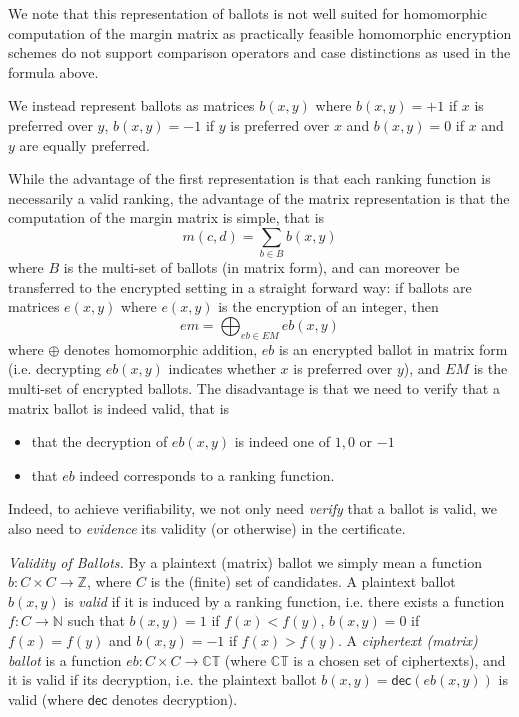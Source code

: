 \documentclass{llncs}
\newcommand{\Nat}{\mathbb{N}}
\newcommand{\Z}{\mathbb{Z}}
\newcommand{\encb}{\mathit{eb}}
\newcommand{\EncB}{\mathit{EM}}
\newcommand{\encm}{\mathit{em}}
\newcommand{\CT}{\mathbb{CT}}
\newcommand{\dec}{\mathsf{dec}}
\begin{document}
We note that this representation of ballots is not well suited for
homomorphic computation of the margin matrix as practically feasible
homomorphic encryption schemes do not support comparison operators
and case distinctions as used in the formula above. 

We instead represent ballots as matrices
$b(x, y)$ where $b(x, y) = +1$ if $x$ is preferred
over $y$, $b(x, y) = -1$ if $y$ is preferred over $x$ and $b(x, y) =
0$ if $x$ and $y$ are equally preferred.

While the advantage of the first representation is that each ranking
function is necessarily a valid ranking, the advantage of the matrix 
representation is that the computation of
the margin matrix is simple, that is
\[ m(c, d) = \sum_{b \in B} b(x, y) \]
where $B$ is the multi-set of ballots (in matrix form), and can
moreover be transferred to the encrypted setting in a straight
forward way: if ballots are matrices $e(x,y)$ where $e(x,y)$ is the
encryption of an integer, then
\begin{equation}\label{eqn:enc-mm}
\encm = \bigoplus_{\encb \in \EncB} \encb(x, y) 
\end{equation}
where $\oplus$ denotes homomorphic addition, $\encb$ is an encrypted
ballot in matrix form (i.e. decrypting $\encb(x, y)$ indicates
whether $x$ is preferred over $y$), and $\EncB$ is the multi-set of
encrypted ballots. The disadvantage is that we need to verify that a
matrix ballot is indeed valid, that is
\begin{itemize}
\item that the decryption of $\encb(x, y)$ is indeed one of $1, 0$ or
$-1$
\item that $\encb$ indeed corresponds to a ranking function.
\end{itemize}

\noindent
Indeed, to achieve verifiability, we not only need \emph{verify}
that a ballot is valid, we also need to \emph{evidence} its validity
(or otherwise) in the certificate.  

\smallskip\noindent\emph{Validity of Ballots.} By a plaintext
(matrix) ballot
we simply mean a function $b: C \times C \to \Z$,
where $C$ is the (finite) set of candidates. A 
plaintext ballot $b(x, y)$ 
is \emph{valid} if it is induced by a ranking function, i.e.
there exists a function $f: C \to \Nat$ such that $b(x, y) = 1$ if
$f(x) < f(y)$, $b(x, y) = 0$ if $f(x) = f(y)$ and $b(x, y) = -1$ if
$f(x) > f(y)$. A \emph{ciphertext (matrix) ballot} is a function
$\encb: C \times C \to \CT$ (where $\CT$ is a chosen set of
ciphertexts), and it is valid if its decryption,  i.e. the plaintext
ballot $b(x, y)  = \dec(\encb(x, y))$ is valid (where $\dec$ denotes
decryption).
\end{document}
